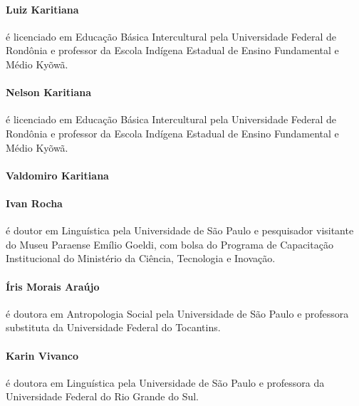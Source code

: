 \paragraph{Luiz Karitiana} é licenciado em Educação Básica Intercultural pela Universidade Federal de Rondônia e professor da Escola Indígena Estadual de Ensino Fundamental e Médio Kyõwã.
\vspace{-0.2cm}

\paragraph{Nelson Karitiana} é licenciado em Educação Básica Intercultural pela Universidade Federal de Rondônia e professor da Escola Indígena Estadual de Ensino Fundamental e Médio Kyõwã.
\vspace{-0.7cm}

\paragraph{Valdomiro Karitiana}  
\vspace{-0.2cm}

\paragraph{Ivan Rocha} é doutor em Linguística pela Universidade de São Paulo e pesquisador visitante do Museu Paraense Emílio Goeldi, com bolsa do Programa de Capacitação Institucional do Ministério da Ciência, Tecnologia e Inovação. 
\vspace{-0.2cm}

\paragraph{Íris Morais Araújo} é doutora em Antropologia Social pela Universidade de São Paulo e professora substituta da Universidade Federal do Tocantins.%
\vspace{-0.2cm}

\paragraph{Karin Vivanco} é doutora em Linguística pela Universidade de São Paulo e professora da Universidade Federal do Rio Grande do Sul.

